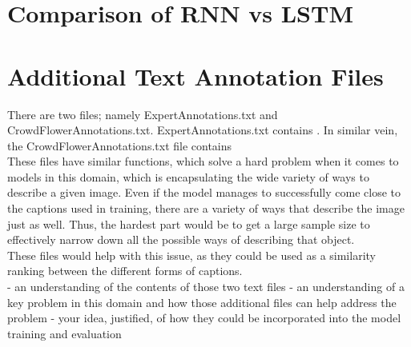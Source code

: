 \documentclass{article}
\begin{document}
    \section{Comparison of RNN vs LSTM}

    \section{Additional Text Annotation Files}

    There are two files; namely ExpertAnnotations.txt and CrowdFlowerAnnotations.txt. ExpertAnnotations.txt contains . In similar vein, the CrowdFlowerAnnotations.txt file contains \\

    These files have similar functions, which solve a hard problem when it comes to models in this domain, which is encapsulating the wide variety of ways to describe a given image. Even if the model manages to successfully come close to the captions used in training, there are a variety of ways that describe the image just as well. Thus, the hardest part would be to get a large sample size to effectively narrow down all the possible ways of describing that object.\\

    These files would help with this issue, as they could be used as a similarity ranking between the different forms of captions.\\



- an understanding of the contents of those two text files
- an understanding of a key problem in this domain and how those additional files can help address the problem
- your idea, justified, of how they could be incorporated into the model training and evaluation 

    
    
\end{document}
